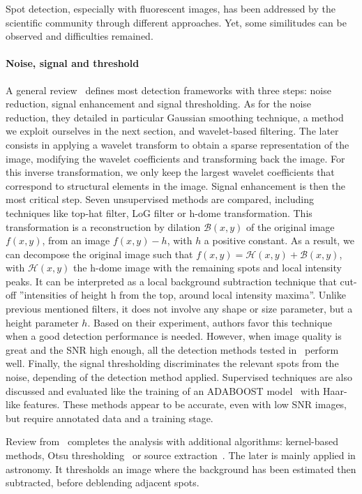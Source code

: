 Spot detection, especially with fluorescent images, has been addressed by the scientific community through different approaches.
Yet, some similitudes can be observed and difficulties remained.

\paragraph{Noise, signal and threshold}

A general review~\cite{smal_quantitative_2010} defines most detection frameworks with three steps: noise reduction, signal enhancement and signal thresholding.
As for the noise reduction, they detailed in particular Gaussian smoothing technique, a method we exploit ourselves in the next section, and wavelet-based filtering.
The later consists in applying a wavelet transform to obtain a sparse representation of the image, modifying the wavelet coefficients and transforming back the image.
For this inverse transformation, we only keep the largest wavelet coefficients that correspond to structural elements in the image.
Signal enhancement is then the most critical step.
Seven unsupervised methods are compared, including techniques like top-hat filter, \ac{LoG} filter or h-dome transformation.
This transformation is a reconstruction by dilation $\mathcal{B}(x, y)$ of the original image $f(x, y)$, from an image $f(x, y) - h$, with $h$ a positive constant.
As a result, we can decompose the original image such that $f(x, y) = \mathcal{H}(x, y) + \mathcal{B}(x, y)$, with $\mathcal{H}(x, y)$ the h-dome image with the remaining spots and local intensity peaks.
It can be interpreted as a local background subtraction technique that cut-off ''intensities of height h from the top, around local intensity maxima''.
Unlike previous mentioned filters, it does not involve any shape or size parameter, but a height parameter $h$.
Based on their experiment, authors favor this technique when a good detection performance is needed.
However, when image quality is great and the \ac{SNR} high enough, all the detection methods tested in~\cite{smal_quantitative_2010} perform well.
Finally, the signal thresholding discriminates the relevant spots from the noise, depending of the detection method applied.
Supervised techniques are also discussed and evaluated like the training of an ADABOOST model~\cite{FREUND1997119} with Haar-like features.
These methods appear to be accurate, even with low \ac{SNR} images, but require annotated data and a training stage.

Review from~\cite{ruusuvuori_evaluation_2010} completes the analysis with additional algorithms: kernel-based methods, Otsu thresholding~\cite{Otsu_1979} or source extraction~\cite{bertin_sextractor_1996}.
The later is mainly applied in astronomy.
It thresholds an image where the background has been estimated then subtracted, before deblending adjacent spots.

